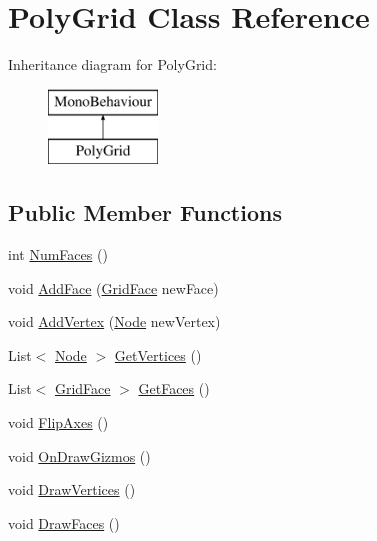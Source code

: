 \hypertarget{class_poly_grid}{}\section{Poly\+Grid Class Reference}
\label{class_poly_grid}
Inheritance diagram for Poly\+Grid\+:\begin{figure}[H]
\begin{center}
\leavevmode
\includegraphics[height=2.000000cm]{class_poly_grid}
\end{center}
\end{figure}
\subsection*{Public Member Functions}
\begin{DoxyCompactItemize}
\item 
int \mbox{\hyperlink{class_poly_grid_abdcb8932a005a5cbd833430662727faf}{Num\+Faces}} ()
\item 
void \mbox{\hyperlink{class_poly_grid_a0fc1f57b2840e01acfc2d7dbe49d2fd1}{Add\+Face}} (\mbox{\hyperlink{class_grid_face}{Grid\+Face}} new\+Face)
\item 
void \mbox{\hyperlink{class_poly_grid_a486c7e7a5829e4bb9966c064db28113d}{Add\+Vertex}} (\mbox{\hyperlink{class_node}{Node}} new\+Vertex)
\item 
List$<$ \mbox{\hyperlink{class_node}{Node}} $>$ \mbox{\hyperlink{class_poly_grid_a35e759e3c28917350c1158e80a664a79}{Get\+Vertices}} ()
\item 
List$<$ \mbox{\hyperlink{class_grid_face}{Grid\+Face}} $>$ \mbox{\hyperlink{class_poly_grid_a4fd6191d005e389d329fc5f855732015}{Get\+Faces}} ()
\item 
void \mbox{\hyperlink{class_poly_grid_a9a19971fbde8f1aaa806d54771857d8b}{Flip\+Axes}} ()
\item 
void \mbox{\hyperlink{class_poly_grid_a1c99b63c71be2e28b2f1b1ccdbdf1c26}{On\+Draw\+Gizmos}} ()
\item 
void \mbox{\hyperlink{class_poly_grid_ae3c6db975b79d96ebb9ec0c16cfda518}{Draw\+Vertices}} ()
\item 
void \mbox{\hyperlink{class_poly_grid_a322dbff12283b94455ad415f554675c6}{Draw\+Faces}} ()
\end{DoxyCompactItemize}
